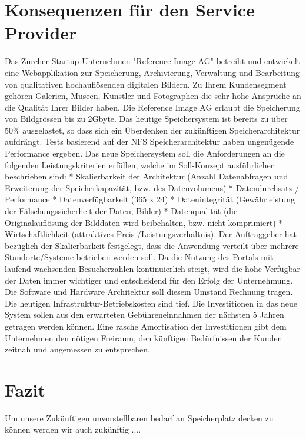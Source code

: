 \section{Konsequenzen für den Service Provider}
Das Zürcher Startup Unternehmen "Reference Image AG" betreibt und entwickelt eine Webapplikation zur Speicherung, Archivierung, Verwaltung und Bearbeitung von qualitativen hochauflösenden digitalen Bildern. Zu Ihrem Kundensegment gehören Galerien, Museen, Künstler und Fotographen die sehr hohe Ansprüche an die Qualität Ihrer Bilder haben. Die Reference Image AG erlaubt die Speicherung von Bildgrössen bis zu 2Gbyte. Das heutige Speichersystem ist bereits zu über 50\% ausgelastet, so dass sich ein Überdenken der zukünftigen Speicherarchitektur aufdrängt. Tests basierend auf der NFS Speicherarchitektur haben ungenügende Performance ergeben. Das neue Speichersystem soll die Anforderungen an die folgenden Leistungskriterien erfüllen, welche im Soll-Konzept ausführlicher beschrieben sind: * Skalierbarkeit der Architektur (Anzahl Datenabfragen und Erweiterung der Speicherkapazität, bzw. des Datenvolumens) * Datendurchsatz / Performance * Datenverfügbarkeit (365 x 24) * Datenintegrität (Gewährleistung der Fälschungssicherheit der Daten, Bilder) * Datenqualität (die Originalauflösung der Bilddaten wird beibehalten, bzw. nicht komprimiert) * Wirtschaftlichkeit (attraktives Preis-/Leistungsverhältnis). Der Auftraggeber hat bezüglich der Skalierbarkeit festgelegt, dass die Anwendung verteilt über mehrere Standorte/Systeme betrieben werden soll. Da die Nutzung des Portals mit laufend wachsenden Besucherzahlen kontinuierlich steigt, wird die hohe Verfügbar der Daten immer wichtiger und entscheidend für den Erfolg der Unternehmung. Die Software und Hardware Architektur soll diesem Umstand Rechnung tragen. Die heutigen Infrastruktur-Betriebskosten sind tief. Die Investitionen in das neue System sollen aus den erwarteten Gebühreneinnahmen der nächsten 5 Jahren getragen werden können. Eine rasche Amortisation der Investitionen gibt dem Unternehmen den nötigen Freiraum, den künftigen Bedürfnissen der Kunden zeitnah und angemessen zu entsprechen. 

\section{Fazit}
Um unsere Zukünftigen unvorstellbaren bedarf an Speicherplatz decken zu können werden wir auch zukünftig ....

